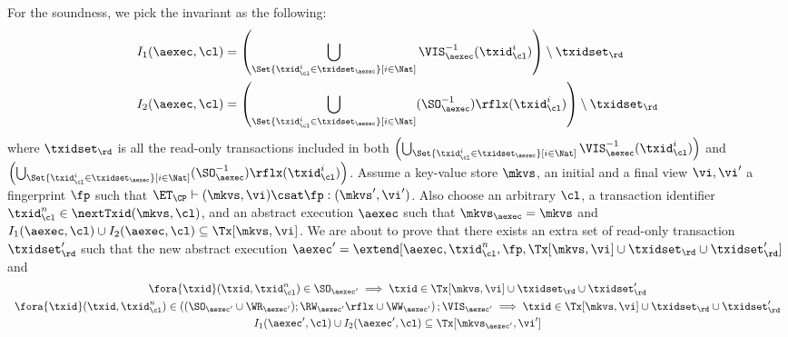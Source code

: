 For the soundness, we pick the invariant as the following:
\begin{align*}
    I_1(\aexec, \cl) & = \left( \bigcup_{\Set{\txid_{\cl}^{i} \in \txidset_{\aexec} }[ i \in \Nat ]} \VIS_{\aexec}^{-1}(\txid^i_\cl) \right) \setminus \txidset_\rd \\
    I_2(\aexec, \cl) & = \left( \bigcup_{\Set{\txid_{\cl}^{i} \in \txidset_{\aexec} }[ i \in \Nat ]} (\SO_{\aexec}^{-1})\rflx(\txid^i_\cl) \right) \setminus \txidset_\rd
\end{align*}
where \( \txidset_\rd \) is all the read-only transactions included in both 
\( \left( \bigcup_{\Set{\txid_{\cl}^{i} \in \txidset_{\aexec} }[ i \in \Nat ]} \VIS_{\aexec}^{-1}(\txid^i_\cl) \right)\) 
and \( \left( \bigcup_{\Set{\txid_{\cl}^{i} \in \txidset_{\aexec} }[ i \in \Nat ]} (\SO_{\aexec}^{-1})\rflx(\txid^i_\cl) \right) \).
Assume a key-value store $\mkvs$, an initial and a final view $\vi, \vi'$  a fingerprint $\fp$ 
such that $\ET_{\CP} \vdash (\mkvs, \vi) \csat \fp: ( \mkvs',\vi')$. 
Also choose an arbitrary $\cl$, a transaction identifier $\txid_\cl^n \in \nextTxid(\mkvs, \cl)$, 
and an abstract execution $\aexec$ such that $\mkvs_{\aexec} = \mkvs$ and 
\( I_1(\aexec, \cl) \cup I_2(\aexec, \cl) \subseteq \Tx[\mkvs, \vi] \).
We are about to prove that there exists an extra set of read-only transaction \( \txidset'_\rd \) such that
the new abstract execution \( \aexec' = \extend[\aexec, \txid_\cl^n, \fp, \Tx[\mkvs, \vi] \cup \txidset_\rd \cup \txidset'_\rd] \) and
\begin{gather}
    \fora{\txid} (\txid, \txid_\cl^n) \in \SO_{\aexec'} \implies \txid \in \Tx[\mkvs, \vi] \cup \txidset_\rd \cup \txidset'_\rd \label{equ:cp-sound-update-so}\\
    \begin{array}{l}
        \fora{\txid} (\txid, \txid_\cl^n) \in \left( (\SO_{\aexec'} \cup \WR_{\aexec'} ) ; \RW_{\aexec'}\rflx \cup \WW_{\aexec'} \right) ; \VIS_{\aexec'} 
    \implies \txid \in \Tx[\mkvs, \vi] \cup \txidset_\rd \cup \txidset'_\rd 
    \end{array}
    \label{equ:cp-sound-update-arvis}\\
    I_1(\aexec',\cl) \cup I_2(\aexec',\cl) \subseteq \Tx[\mkvs_{\aexec'}, \vi'] \label{equ:cp-sound-inv} 
\end{gather}

